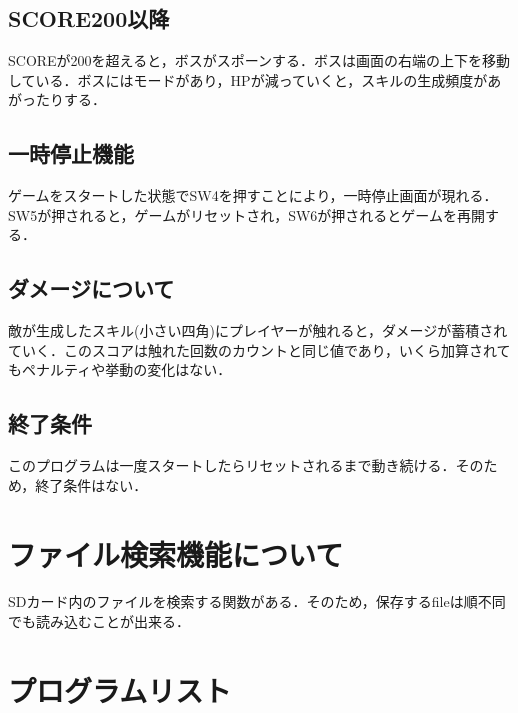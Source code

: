 \documentclass[a4paper,11pt]{ltjsarticle}
\begin{document}
\subsection{SCORE200以降}
SCOREが200を超えると，ボスがスポーンする．ボスは画面の右端の上下を移動している．ボスにはモードがあり，HPが減っていくと，スキルの生成頻度があがったりする．
\subsection{一時停止機能}
ゲームをスタートした状態でSW4を押すことにより，一時停止画面が現れる．SW5が押されると，ゲームがリセットされ，SW6が押されるとゲームを再開する．
\subsection{ダメージについて}
敵が生成したスキル(小さい四角)にプレイヤーが触れると，ダメージが蓄積されていく．このスコアは触れた回数のカウントと同じ値であり，いくら加算されてもペナルティや挙動の変化はない．
\subsection{終了条件}
このプログラムは一度スタートしたらリセットされるまで動き続ける．そのため，終了条件はない．
\section{ファイル検索機能について}
SDカード内のファイルを検索する関数がある．そのため，保存するfileは順不同でも読み込むことが出来る．
\newpage
\section{プログラムリスト}

\end{document}
